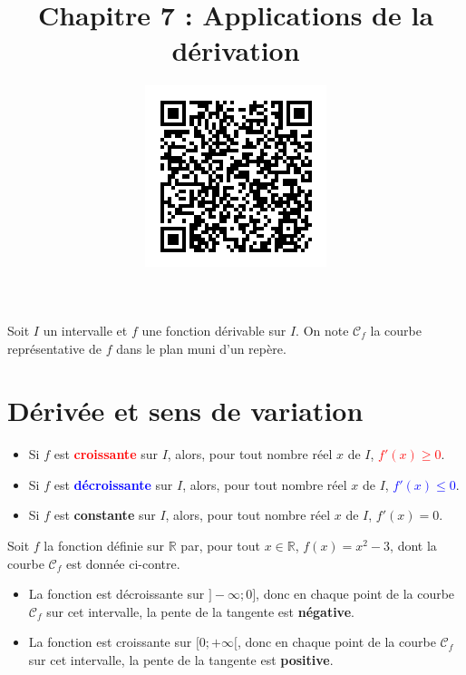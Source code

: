 \documentclass[11pt]{article}
\title{\vspace{-15mm}Chapitre 7 : Applications de la dérivation}
\date{\vspace{-14mm}
\href{https://erou.forge.aeif.fr/spe-1e/application-derivation.html}{
  \includegraphics[scale=.6]{qrcode.png}}
\vspace{-12mm}}
\author{}
\newcommand{\Cf}{\mathscr C_{f}}
\begin{document}
\maketitle\thispagestyle{fancy}
Soit $I$ un intervalle et $f$ une fonction dérivable sur $I$. On note $\Cf$ la
courbe représentative de $f$ dans le plan muni d'un repère.
\section{Dérivée et sens de variation}
\noindent\begin{minipage}{.6\textwidth}
\begin{thm}
  \begin{itemize}
    \item Si $f$ est \textbf{\textcolor{red}{croissante}} sur $I$, alors, pour tout
      nombre réel $x$ de $I$, \textcolor{red}{$f'(x)\geq 0$}.
    \item Si $f$ est \textbf{\textcolor{blue}{décroissante}} sur $I$, alors, pour tout
      nombre réel $x$ de $I$, \textcolor{blue}{$f'(x)\leq 0$}.
    \item Si $f$ est \textbf{\textcolor{green!50!black}{constante}} sur $I$, alors, pour tout
      nombre réel $x$ de $I$, \textcolor{green!50!black}{$f'(x) = 0$}.
  \end{itemize}
\end{thm}
\begin{exemple}
    Soit $f$ la fonction définie sur $\mathbb{R}$ par, pour tout
    $x\in\mathbb{R}$, $f(x)=x^2-3$, dont la courbe $\Cf$ est donnée ci-contre.
    \begin{itemize}
    \item La fonction est décroissante sur $]-\infty; 0]$, donc en chaque point
        de la courbe $\Cf$ sur cet intervalle, la pente de la tangente est
        \textbf{négative}.
      \item La fonction est croissante sur $[0;+\infty[$, donc en chaque point
          de la courbe $\Cf$ sur cet intervalle, la pente de la tangente est
          \textbf{positive}.
    \end{itemize}
\end{exemple}
\end{minipage}
\begin{minipage}{.4\textwidth}
    \begin{center}
    \end{center}
  \end{minipage}
\end{document}
